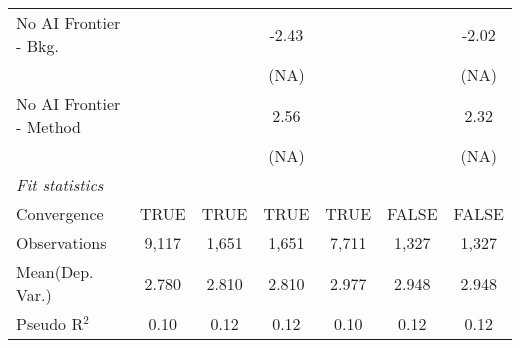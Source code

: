 \begin{tabular}{lcccccc}
   No AI Frontier - Bkg.   &              &        & -2.43  &              &        & -2.02\\   
                           &              &        & (NA)   &              &        & (NA)\\   
   No AI Frontier - Method &              &        & 2.56   &              &        & 2.32\\   
                           &              &        & (NA)   &              &        & (NA)\\   
   \midrule
   \emph{Fit statistics}\\
   Convergence             &TRUE          & TRUE   & TRUE   & TRUE         & FALSE  & FALSE\\  
   Observations            & 9,117        & 1,651  & 1,651  & 7,711        & 1,327  & 1,327\\  
Mean(Dep. Var.) & 2.780 & 2.810 & 2.810 & 2.977 & 2.948 & 2.948 \\
   Pseudo R$^2$            & 0.10         & 0.12   & 0.12   & 0.10         & 0.12   & 0.12\\  
   

\end{tabular}

